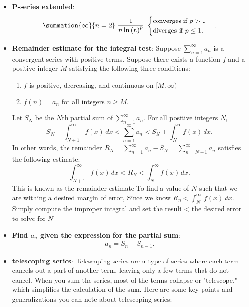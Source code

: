 \documentclass{report}
\begin{document}
\begin{itemize}
    \item \textbf{P-series extended}:
        \begin{align*}
            \summation{\infty}{n=2}\ \frac{1}{n\ln{(n)}^{p}}\ 
            \begin{cases}
                \text{converges if } p>1 \\
                \text{diverges if } p \leq 1.
            \end{cases}
        .\end{align*}
    \item \textbf{Remainder estimate for the integral test}:
        Suppose \( \sum_{n=1}^{\infty} a_n \)
        is a convergent series with positive terms. Suppose there exists a function \( f \) and a positive integer $M$
        satisfying the following three conditions:
        \begin{enumerate}
            \item \( f \) is positive, decreasing, and continuous on $[M,\infty)$
            \item \( f(n) = a_n \) for all integers \( n \geq M \).
        \end{enumerate}
        Let \( S_N \) be the \( N \)th partial sum of \( \sum_{n=1}^{\infty} a_n \).
        For all positive integers \( N \),
        \[
            S_N + \int_{N+1}^{\infty} f(x) \, dx < \sum_{n=1}^{\infty} a_n < S_N + \int_{N}^{\infty} f(x) \, dx.
        \]
        In other words, the remainder \( R_N = \sum_{n=1}^{\infty} a_n - S_N = \sum_{n=N+1}^{\infty} a_n \)
        satisfies the following estimate:
        \[
            \int_{N+1}^{\infty} f(x) \, dx < R_N < \int_{N}^{\infty} f(x) \, dx.
        \]
        This is known as the remainder estimate 
        \bigbreak \noindent 
        To find a value of $N$ such that we are withing a desired margin of error, Since we know $R_{n} < \int_{N}^{\infty}\ f(x)\ dx $. Simply compute the improper integral and set the result < the desired error to solve for $N$
    \item \textbf{Find $a_{n}$ given the expression for the partial sum}:
        \begin{align*}
            a_{n} = S_{n} - S_{n-1}
        .\end{align*}
    \item \textbf{telescoping series}: Telescoping series are a type of series where each term cancels out a part of another term, leaving only a few terms that do not cancel. When you sum the series, most of the terms collapse or "telescope," which simplifies the calculation of the sum. Here are some key points and generalizations you can note about telescoping series:

\end{itemize}
\end{document}
